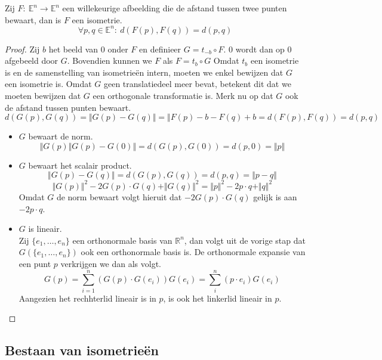 \documentclass[main.tex]{subfiles}
\begin{document}
\begin{st}
  Zij $F:\ \mathbb{E}^{n}\rightarrow \mathbb{E}^{n}$ een willekeurige afbeelding die de afstand tussen twee punten bewaart, dan is $F$ een isometrie.
  \[ \forall p,q \in \mathbb{E}^{n}:\  d(F(p),F(q)) = d(p,q) \]

  \begin{proof}
    Zij $b$ het beeld van $0$ onder $F$ en definieer $G = t_{-b} \circ F$.
    $0$ wordt dan op $0$ afgebeeld door $G$.
    Bovendien kunnen we $F$ als $F = t_{b} \circ G$
    Omdat $t_{b}$ een isometrie is en de samenstelling van isometrie\"en intern, moeten we enkel bewijzen dat $G$ een isometrie is.
    Omdat $G$ geen translatiedeel meer bevat, betekent dit dat we moeten bewijzen dat $G$ een orthogonale transformatie is.
    Merk nu op dat $G$ ook de afstand tussen punten bewaart.
    \[ d(G(p),G(q)) = \Vert G(p) - G(q) \Vert = \Vert F(p) - b - F(q) + b = d(F(p),F(q)) = d(p,q) \]
    \begin{itemize}
    \item $G$ bewaart de norm.\\
      \[ \Vert G(p) \Vert G(p) - G(0) \Vert = d(G(p),G(0)) = d(p,0) = \Vert p \Vert \]
    \item $G$ bewaart het scalair product.\\
      \[ \Vert G(p) - G(q) \Vert = d(G(p),G(q)) = d(p,q) = \Vert p-q \Vert \]
      \[ \Vert G(p)\Vert^{2} -2 G(p) \cdot G(q) + \Vert G(q) \Vert^{2} = \Vert p \Vert^{2} - 2p\cdot q + \Vert q \Vert^{2} \]
      Omdat $G$ de norm bewaart volgt hieruit dat $-2 G(p) \cdot G(q)$ gelijk is aan $- 2p\cdot q$.
    \item $G$ is lineair.\\
      Zij $\{ e_{1},\dotsc,e_{n}\}$ een orthonormale basis van $\mathbb{R}^{n}$, dan volgt uit de vorige stap dat $G(\{ e_{1},\dotsc,e_{n}\})$ ook een orthonormale basis is.
      De orthonormale expansie van een punt $p$ verkrijgen we dan als volgt.
      \[ G(p) = \sum_{i=1}^{n}(G(p) \cdot G(e_{i}))G(e_{i}) = \sum_{i}^{n}(p\cdot e_{i}) G(e_{i}) \]
      Aangezien het rechhterlid lineair is in $p$, is ook het linkerlid lineair in $p$.
    \end{itemize}
  \end{proof}
\end{st}

\subsection{Bestaan van isometrie\"en}
\label{sec:best-van-isom}
\end{document}
